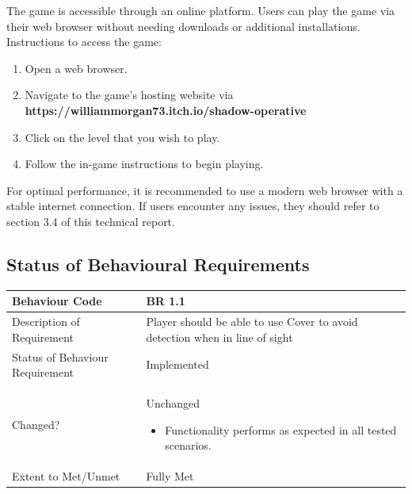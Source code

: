 \documentclass[11pt, a4paper]{article}
\begin{document}
\noindent The game is accessible through an online platform. Users can play the game via their web browser without needing downloads or additional installations. \\

\noindent Instructions to access the game:

\begin{enumerate}
    \item Open a web browser.
    \item Navigate to the game’s hosting website via \textbf{https://williammorgan73.itch.io/shadow-operative}
    \item Click on the level that you wish to play.
    \item Follow the in-game instructions to begin playing.
\end{enumerate}

\noindent For optimal performance, it is recommended to use a modern web browser with a stable internet connection. If users encounter any issues, they should refer to section 3.4 of this technical report.

\newpage

\subsection{Status of Behavioural Requirements}

\begin{center}
\begin{tabularx}{\linewidth}{|>{\raggedright\arraybackslash}m{4cm}|X|}
    \hline
    Behaviour Code & \textbf{BR 1.1} \\
    \hline
    Description of Requirement & Player should be able to use Cover to avoid detection when in line of sight \\
    \hline
    Status of Behaviour Requirement & Implemented \\
    \hline
    Changed? &
    Unchanged
    \begin{itemize}
        \item Functionality performs as expected in all tested scenarios.
    \end{itemize} \\
    \hline
    Extent to Met/Unmet & Fully Met \\
    \hline
\end{tabularx}
\end{center}
\end{document}
